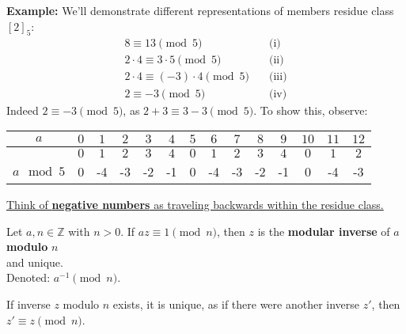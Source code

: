 \noindent
\textbf{Example:} We'll demonstrate different representations of members residue class $[2]_5$:
\begin{align*}
    8 \equiv 13 \pmod{5} & \quad \text{(i)} \\
    2\cdot4 \equiv 3\cdot5 \pmod{5} & \quad \text{(ii)} \\
    2\cdot4 \equiv (-3)\cdot4 \pmod{5} & \quad \text{(iii)} \\ 
    2 \equiv -3 \pmod{5} & \quad \text{(iv)}
\end{align*}
Indeed $2\equiv-3\pmod{5}$, as $2+3\equiv3-3\pmod{5}$. To show this, observe:

\begin{table}[h!]
    \setlength{\tabcolsep}{10pt} %
    \renewcommand{\arraystretch}{1.2} %
    \centering
\begin{tabular}{|*{14}{c|}}
    
    
    \hline
   \rowcolor{OliveGreen!10}\cellcolor{white}$a$ & $0$ & $1$ & $2$ & $3$ & $4$ & $5$ & $6$ & $7$ & $8$ & $9$ & $10$ & $11$ & $12$ \\
    \hline
       & $0$ & $1$ & $2$ & $3$ & $4$ & $0$ & $1$ & $2$ & $3$ & $4$ & $0$ & $1$ & $2$ \\
    \cline{2-14}
    \multirow{-2}{*}{$a\mod 5$}&0&-4&-3&-2&-1&0&-4&-3&-2&-1&0&-4&-3\\
    \hline
\end{tabular}
\end{table}
\noindent
\underline{Think of \textbf{negative numbers} as traveling backwards within the residue class.}

\begin{Def}
    
    Let $a,n\in\mathbb{Z}$ with $n>0$. If $az\equiv1\pmod{n}$, then $z$ is the \textbf{modular inverse} of $a$ \textbf{modulo} $n$\\
    and unique.\\

    \noindent
    Denoted: $a^{-1}\pmod{n}$.
\end{Def}
\noindent
If inverse $z$ modulo $n$ exists, it is unique, as if there were another inverse $z'$, then $z'\equiv z\pmod{n}$.\\

